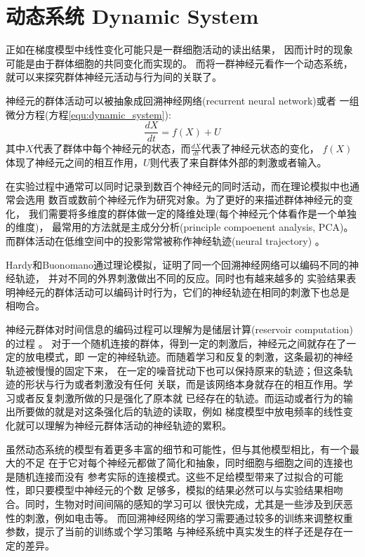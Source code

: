 \section{动态系统 Dynamic System}

正如在梯度模型中线性变化可能只是一群细胞活动的读出结果，
因而计时的现象可能是由于群体细胞的共同变化而实现的。
而将一群神经元看作一个动态系统，就可以来探究群体神经元活动与行为间的关联了。

神经元的群体活动可以被抽象成回溯神经网络(recurrent neural network)或者
一组微分方程(方程\ref{equ:dynamic_system})\cite{remington2018dynamical}:
\begin{equation}
    \label{equ:dynamic_system}
    \frac{dX}{dt} = f(X) + U
\end{equation}
其中$X$代表了群体中每个神经元的状态，而$\frac{dX}{dt}$代表了神经元状态的变化，
$f(X)$体现了神经元之间的相互作用，$U$则代表了来自群体外部的刺激或者输入。

在实验过程中通常可以同时记录到数百个神经元的同时活动，而在理论模拟中也通常会选用
数百或数前个神经元作为研究对象。为了更好的来描述群体神经元的变化，
我们需要将多维度的群体做一定的降维处理(每个神经元个体看作是一个单独的维度)，
最常用的方法就是主成分分析(principle compoenent analysis, PCA)。
而群体活动在低维空间中的投影常常被称作神经轨迹(neural trajectory)
\cite{remington2018dynamical,paton2018neural}。

Hardy和Buonomano通过理论模拟，证明了同一个回溯神经网络可以编码不同的神经轨迹，
并对不同的外界刺激做出不同的反应\cite{hardy2018encoding}。同时也有越来越多的
实验结果表明神经元的群体活动可以编码计时行为，它们的神经轨迹在相同的刺激下也总是
相吻合\cite{paton2018neural,remington2018dynamical,bakhurin2017differential}。

神经元群体对时间信息的编码过程可以理解为是储层计算(reservoir computation)的过程
\cite{hardy2018encoding,paton2018neural,remington2018dynamical,maass2002real}。
对于一个随机连接的群体，得到一定的刺激后，神经元之间就存在了一定的放电模式，即
一定的神经轨迹。而随着学习和反复的刺激，这条最初的神经轨迹被慢慢的固定下来，
在一定的噪音扰动下也可以保持原来的轨迹；但这条轨迹的形状与行为或者刺激没有任何
关联，而是该网络本身就存在的相互作用。学习或者反复刺激所做的只是强化了原本就
已经存在的轨迹。而运动或者行为的输出所要做的就是对这条强化后的轨迹的读取，例如
梯度模型中放电频率的线性变化就可以理解为神经元群体活动的神经轨迹的累积。




虽然动态系统的模型有着更多丰富的细节和可能性，但与其他模型相比，有一个最大的不足
在于它对每个神经元都做了简化和抽象，同时细胞与细胞之间的连接也是随机连接而没有
参考实际的连接模式。这些不足给模型带来了过拟合的可能性，即只要模型中神经元的个数
足够多，模拟的结果必然可以与实验结果相吻合。同时，生物对时间间隔的感知的学习可以
很快完成，尤其是一些涉及到厌恶性的刺激\cite{simen2011model}，例如电击等。
而回溯神经网络的学习需要通过较多的训练来调整权重参数，提示了当前的训练或个学习策略
与神经系统中真实发生的样子还是存在一定的差异。

